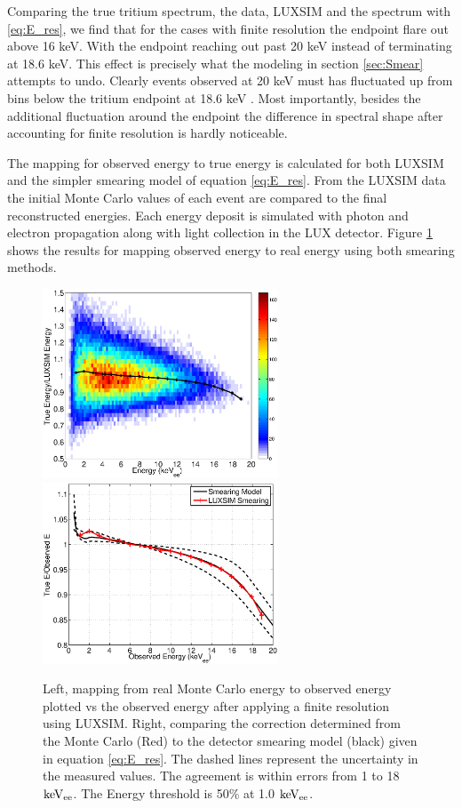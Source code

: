 Comparing the true tritium spectrum, the data, LUXSIM and the spectrum with  \ref{eq:E_res}, we find that for the cases with finite resolution the endpoint flare out  above 16 keV. With the endpoint reaching out past 20 keV instead of terminating at 18.6 keV. This effect is precisely what the modeling in section \ref{sec:Smear} attempts to undo. Clearly events observed at 20 keV must has fluctuated up from bins below the tritium endpoint at 18.6 keV \cite{Tritium_Q}. Most importantly, besides the additional fluctuation around the endpoint the difference in spectral shape after accounting for finite resolution is hardly noticeable.


The mapping for observed energy to true energy is calculated for both LUXSIM and the simpler smearing model of equation \ref{eq:E_res}. From the LUXSIM data the initial Monte Carlo values of each event are compared to the final reconstructed energies. Each energy deposit is simulated with photon and electron propagation along with light collection in the LUX detector. Figure \ref{fig:E_mapping} shows the results for mapping observed energy to real energy using both smearing methods. 

 \begin{figure}[h!]\centering
\includegraphics[width=70mm]{Chapter_Flucs/Figures/E_density_LUX_SIM_Tritium.eps}
\includegraphics[width=70mm]{Chapter_Flucs/Figures/E_corr.eps}
\caption{Left, mapping from real Monte Carlo energy to observed energy plotted vs the observed energy after applying a finite resolution using LUXSIM. Right, comparing the correction determined from the Monte Carlo (Red) to the detector smearing model (black) given in equation \ref{eq:E_res}. The dashed lines represent the uncertainty in the measured values. The agreement is within errors from 1 to 18 $\rm keV_{ee}$. The Energy threshold is 50\% at 1.0 $\rm keV_{ee}$.}
\label{fig:E_mapping}
\end{figure}

